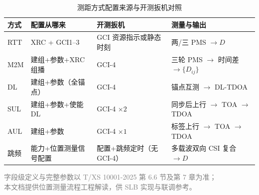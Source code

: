 \documentclass[11pt,a4paper]{ctexart}
\begin{document}
\begin{longtable}{L{1.6cm}L{2.8cm}L{3.5cm}L{5cm}}
\caption{测距方式配置来源与开测扳机对照\label{tab:66-methods}} \\
\toprule
\textbf{方式} & \textbf{配置从哪来} & \textbf{开测扳机} & \textbf{测量与输出} \\
\midrule
RTT & XRC + GCI1--3 & GCI 资源指示或静态时刻 & 两/三 PMS $\rightarrow D$ \\
M2M & 建组+参数+XRC 组播 & GCI-4 & 三轮 PMS $\rightarrow$ 时间差 $\rightarrow\{D_{ij}\}$ \\
DL & 建组+参数（全锚点） & GCI-4 & 锚点互测 $\rightarrow$ DL-TDOA \\
SUL & 建组+参数+使能 DL & GCI-4 $\times 2$ & 同步后上行 $\rightarrow$ TOA $\rightarrow$ TDOA \\
AUL & 建组+参数 & GCI-4 $\times 1$ & 标签上行 $\rightarrow$ TOA $\rightarrow$ TDOA \\
跳频 & 能力+位置测量信号配置 & 配置+跳频定时（无 GCI-4） & 多载波双向 CSI 复合 $\rightarrow D$ \\
\bottomrule
\end{longtable}



\vfill
\begin{center}
\small\textcolor{gray}{字段级定义与完整参数以 T/XS 10001-2025 第 6.6 节及第 7 章为准；\\
本文档提供位置测量流程工程解读，供 SLB 实现与联调参考。}
\end{center}
\end{document}
